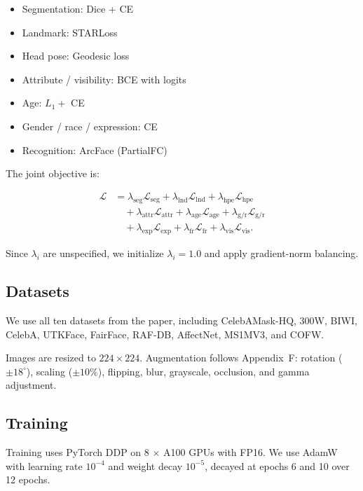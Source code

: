 \begin{itemize}
\item Segmentation: Dice + CE
\item Landmark: STARLoss
\item Head pose: Geodesic loss
\item Attribute / visibility: BCE with logits
\item Age: $L_1 +$ CE
\item Gender / race / expression: CE
\item Recognition: ArcFace (PartialFC)
\end{itemize}

The joint objective is:

\begin{align}
\mathcal{L} &= \lambda_{\text{seg}} \mathcal{L}_{\text{seg}} 
+ \lambda_{\text{lnd}} \mathcal{L}_{\text{lnd}} 
+ \lambda_{\text{hpe}} \mathcal{L}_{\text{hpe}} \\
&\quad + \lambda_{\text{attr}} \mathcal{L}_{\text{attr}} 
+ \lambda_{\text{age}} \mathcal{L}_{\text{age}} 
+ \lambda_{\text{g/r}} \mathcal{L}_{\text{g/r}} \\
&\quad + \lambda_{\text{exp}} \mathcal{L}_{\text{exp}} 
+ \lambda_{\text{fr}} \mathcal{L}_{\text{fr}} 
+ \lambda_{\text{vis}} \mathcal{L}_{\text{vis}} .
\end{align}

Since $\lambda_i$ are unspecified, we initialize $\lambda_i = 1.0$ and apply gradient-norm balancing.

\subsection{Datasets}

We use all ten datasets from the paper, including CelebAMask-HQ, 300W, BIWI, CelebA, UTKFace, FairFace, RAF-DB, AffectNet, MS1MV3, and COFW.

Images are resized to $224 \times 224$. Augmentation follows Appendix~F: rotation ($\pm 18^\circ$), scaling ($\pm 10\%$), flipping, blur, grayscale, occlusion, and gamma adjustment.

\subsection{Training}

Training uses PyTorch DDP on 8 $\times$ A100 GPUs with FP16. We use AdamW with learning rate $10^{-4}$ and weight decay $10^{-5}$, decayed at epochs 6 and 10 over 12 epochs.

